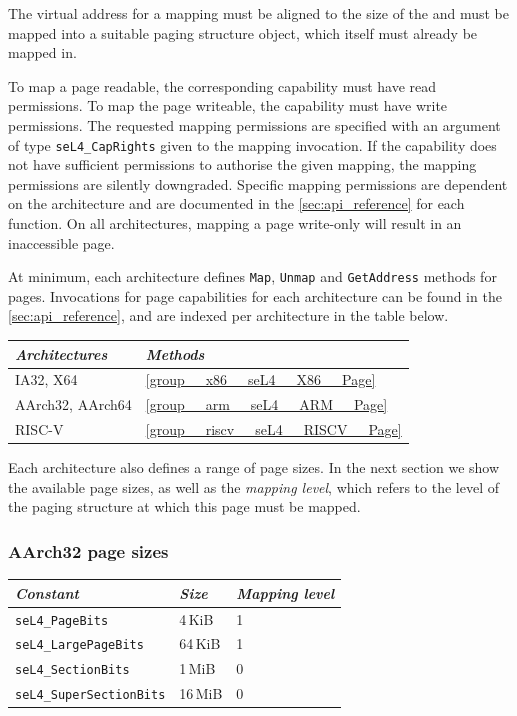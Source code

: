 The virtual address for a  mapping must be aligned to the size of the  and must
be mapped into a suitable paging structure object, which itself must already be mapped in.

To map a page readable, the corresponding  capability must have read permissions. To map
the page writeable, the capability must have write permissions. The requested mapping permissions
are specified with an argument of type \texttt{seL4\_CapRights} given to the mapping invocation. If
the capability does not have sufficient permissions to authorise the given mapping, the mapping
permissions are silently downgraded. Specific mapping permissions are dependent on the architecture
and are documented in the \autoref{sec:api_reference} for each function. On all architectures,
mapping a page write-only will result in an inaccessible page.

At minimum, each architecture defines \texttt{Map}, \texttt{Unmap} and
\texttt{GetAddress} methods for pages.
Invocations for page capabilities for each architecture can be found in the \autoref{sec:api_reference}, and
are indexed per architecture in the table below.

\begin{tabularx}{\textwidth}{Xl} \toprule
\emph{Architectures} & \emph{Methods} \\ \midrule
IA32, X64            & \autoref{group__x86__seL4__X86__Page} \\
AArch32, AArch64     & \autoref{group__arm__seL4__ARM__Page} \\
    RISC-V           & \autoref{group__riscv__seL4__RISCV__Page} \\
\bottomrule
\end{tabularx}

Each architecture also defines a range of page sizes. In the next section we show the available page
sizes, as well as the \emph{mapping level}, which refers to
the level of the paging structure at which this page must be mapped.

\subsubsection{AArch32 page sizes}

\begin{tabularx}{\textwidth}{Xll} \toprule
    \emph{Constant}             & \emph{Size} & \emph{Mapping level} \\ \midrule
    \texttt{seL4\_PageBits}      & 4\,KiB      & 1                   \\
    \texttt{seL4\_LargePageBits} & 64\,KiB     & 1                   \\
    \texttt{seL4\_SectionBits}   & 1\,MiB      & 0                   \\
    \texttt{seL4\_SuperSectionBits} & 16\,MiB  & 0                   \\
    \bottomrule
\end{tabularx}

